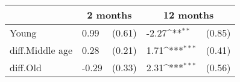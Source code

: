 {
\def\sym#1{\ifmmode^{#1}\else\(^{#1}\)\fi}
\begin{tabular*}{.65\hsize}{@{\hskip\tabcolsep\extracolsep\fill}l*{2}{lc}}
\toprule
                &\multicolumn{2}{c}{2 months}&\multicolumn{2}{c}{12 months}\\
\midrule
Young           &     0.99         &   (0.61)&    -2.27\sym{**} &   (0.85)\\
diff.Middle age &     0.28         &   (0.21)&     1.71\sym{***}&   (0.41)\\
diff.Old        &    -0.29         &   (0.33)&     2.31\sym{***}&   (0.56)\\
\bottomrule
\end{tabular*}
}

